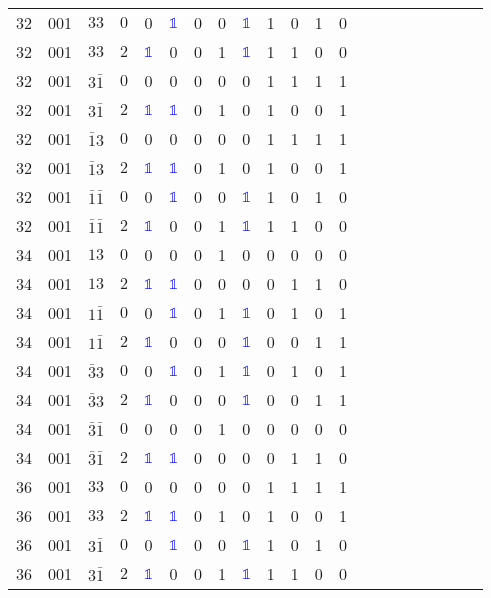 \begin{longtable*}{c| cccccccccccccccccccc }
32& 001& $33$& $0$& 0& \textcolor{blue}{$\mathds{1}$}& 0& 0& \textcolor{blue}{$\mathds{1}$}& 1& 0& 1& 0\\
32& 001& $33$& $2$& \textcolor{blue}{$\mathds{1}$}& 0& 0& 1& \textcolor{blue}{$\mathds{1}$}& 1& 1& 0& 0\\
32& 001& $3\bar{1}$& $0$& 0& 0& 0& 0& 0& 1& 1& 1& 1\\
32& 001& $3\bar{1}$& $2$& \textcolor{blue}{$\mathds{1}$}& \textcolor{blue}{$\mathds{1}$}& 0& 1& 0& 1& 0& 0& 1\\
32& 001& $\bar{1}3$& $0$& 0& 0& 0& 0& 0& 1& 1& 1& 1\\
32& 001& $\bar{1}3$& $2$& \textcolor{blue}{$\mathds{1}$}& \textcolor{blue}{$\mathds{1}$}& 0& 1& 0& 1& 0& 0& 1\\
32& 001& $\bar{1}\bar{1}$& $0$& 0& \textcolor{blue}{$\mathds{1}$}& 0& 0& \textcolor{blue}{$\mathds{1}$}& 1& 0& 1& 0\\
32& 001& $\bar{1}\bar{1}$& $2$& \textcolor{blue}{$\mathds{1}$}& 0& 0& 1& \textcolor{blue}{$\mathds{1}$}& 1& 1& 0& 0\\
34& 001& $13$& $0$& 0& 0& 0& 1& 0& 0& 0& 0& 0\\
34& 001& $13$& $2$& \textcolor{blue}{$\mathds{1}$}& \textcolor{blue}{$\mathds{1}$}& 0& 0& 0& 0& 1& 1& 0\\
34& 001& $1\bar{1}$& $0$& 0& \textcolor{blue}{$\mathds{1}$}& 0& 1& \textcolor{blue}{$\mathds{1}$}& 0& 1& 0& 1\\
34& 001& $1\bar{1}$& $2$& \textcolor{blue}{$\mathds{1}$}& 0& 0& 0& \textcolor{blue}{$\mathds{1}$}& 0& 0& 1& 1\\
34& 001& $\bar{3}3$& $0$& 0& \textcolor{blue}{$\mathds{1}$}& 0& 1& \textcolor{blue}{$\mathds{1}$}& 0& 1& 0& 1\\
34& 001& $\bar{3}3$& $2$& \textcolor{blue}{$\mathds{1}$}& 0& 0& 0& \textcolor{blue}{$\mathds{1}$}& 0& 0& 1& 1\\
34& 001& $\bar{3}\bar{1}$& $0$& 0& 0& 0& 1& 0& 0& 0& 0& 0\\
34& 001& $\bar{3}\bar{1}$& $2$& \textcolor{blue}{$\mathds{1}$}& \textcolor{blue}{$\mathds{1}$}& 0& 0& 0& 0& 1& 1& 0\\
36& 001& $33$& $0$& 0& 0& 0& 0& 0& 1& 1& 1& 1\\
36& 001& $33$& $2$& \textcolor{blue}{$\mathds{1}$}& \textcolor{blue}{$\mathds{1}$}& 0& 1& 0& 1& 0& 0& 1\\
36& 001& $3\bar{1}$& $0$& 0& \textcolor{blue}{$\mathds{1}$}& 0& 0& \textcolor{blue}{$\mathds{1}$}& 1& 0& 1& 0\\
36& 001& $3\bar{1}$& $2$& \textcolor{blue}{$\mathds{1}$}& 0& 0& 1& \textcolor{blue}{$\mathds{1}$}& 1& 1& 0& 0\\

\end{longtable*}
